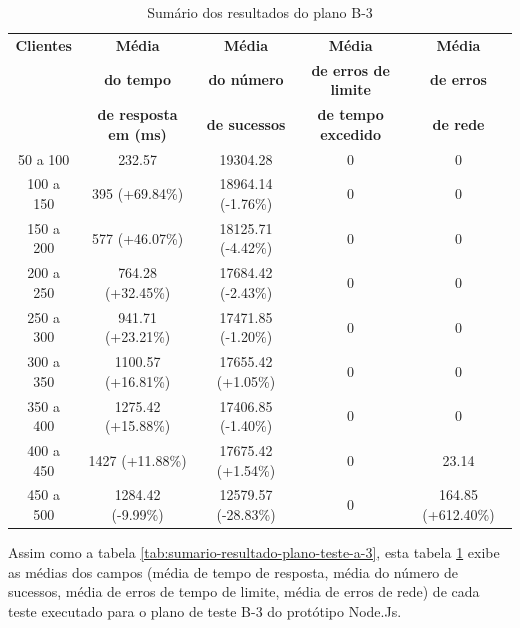   \begin{table}[H]
    \centering
    \footnotesize
    \setlength{\abovecaptionskip}{0pt}
    \setlength{\belowcaptionskip}{0pt}
    \caption[Sumário dos resultados do plano B-3]{Sumário dos resultados do plano B-3}
    \label{tab:sumario-resultado-plano-teste-b-3}
    \begin{tabular}{c|c|c|c|c}
      \hline \hline
      \textbf{Clientes} & \textbf{Média} &	\textbf{Média} & \textbf{Média} & \textbf{Média}  \\
      {}		& \textbf{do tempo} &   \textbf{do número } & \textbf{de erros de limite} & \textbf{de erros}  \\
      {}		& \textbf{de resposta em (ms) } &\textbf{de sucessos } & \textbf{de tempo excedido} & \textbf{de rede} \\
      \hline \hline
      50 a 100 &		232.57  &			19304.28 &	 		0 &			0 \\
      100 a 150&		395 (+69.84\%)&			18964.14 (-1.76\%)&		0 &			0 \\
      150 a 200&		577 (+46.07\%)&			18125.71 (-4.42\%)& 		0 &			0 \\
      200 a 250&		764.28 (+32.45\%)&		17684.42 (-2.43\%)& 		0 &			0 \\
      250 a 300&		941.71 (+23.21\%)&		17471.85 (-1.20\%)& 		0 &			0 \\
      300 a 350&		1100.57 (+16.81\%)&		17655.42 (+1.05\%)& 		0 &			0 \\
      350 a 400&		1275.42 (+15.88\%)&		17406.85 (-1.40\%)& 		0 &			0 \\
      400 a 450&		1427 (+11.88\%)&		17675.42 (+1.54\%)& 		0 &			23.14 \\
      450 a 500&		1284.42 (-9.99\%)&		12579.57 (-28.83\%)& 		0 &			164.85 (+612.40\%)\\
      \hline \hline
    \end{tabular}
  \end{table}

  Assim como a tabela \ref{tab:sumario-resultado-plano-teste-a-3}, esta tabela \ref{tab:sumario-resultado-plano-teste-b-3} exibe as médias
  dos campos (média de tempo de resposta, média do número de sucessos, média de erros de tempo de limite, média de erros de rede)
  de cada teste executado para o plano de teste B-3 do protótipo Node.Js.

